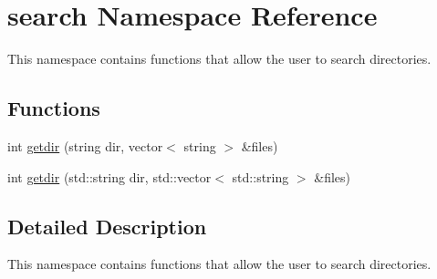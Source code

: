 \hypertarget{namespacesearch}{\section{search Namespace Reference}
\label{namespacesearch}
}


This namespace contains functions that allow the user to search directories.  


\subsection*{Functions}
\begin{DoxyCompactItemize}
\item 
int \hyperlink{namespacesearch_a2f52a0545d237d7a566fcaa887bdc784}{getdir} (string dir, vector$<$ string $>$ \&files)
\item 
int \hyperlink{namespacesearch_aca625fab72dc71c5ebdabd84169040e1}{getdir} (std\+::string dir, std\+::vector$<$ std\+::string $>$ \&files)
\end{DoxyCompactItemize}


\subsection{Detailed Description}
This namespace contains functions that allow the user to search directories. 

